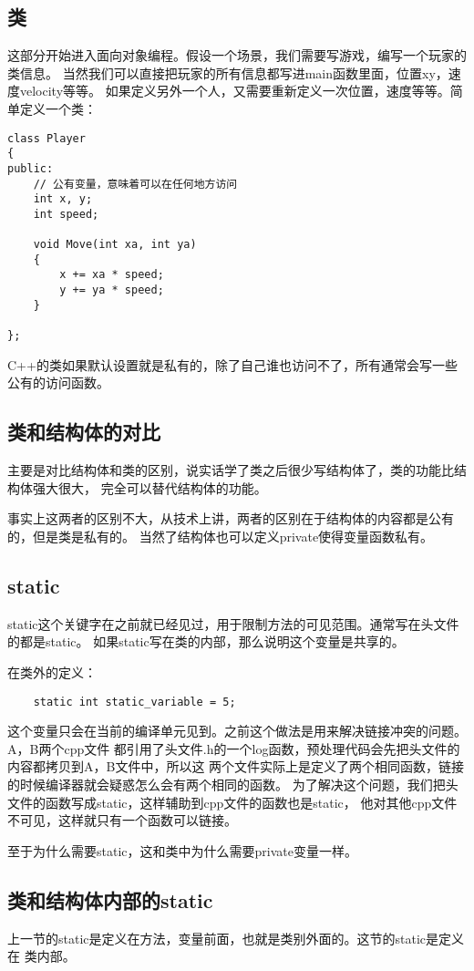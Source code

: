 \documentclass{article}
\begin{document}
\begin{sloppypar}
\subsection{类}
这部分开始进入面向对象编程。假设一个场景，我们需要写游戏，编写一个玩家的类信息。
当然我们可以直接把玩家的所有信息都写进main函数里面，位置xy，速度velocity等等。
如果定义另外一个人，又需要重新定义一次位置，速度等等。简单定义一个类：
\begin{lstlisting}
class Player
{
public:
    // 公有变量，意味着可以在任何地方访问
    int x, y;
    int speed;

    void Move(int xa, int ya)
    {
        x += xa * speed;
        y += ya * speed;
    }

};
\end{lstlisting}
C++的类如果默认设置就是私有的，除了自己谁也访问不了，所有通常会写一些公有的访问函数。

\subsection{类和结构体的对比}
主要是对比结构体和类的区别，说实话学了类之后很少写结构体了，类的功能比结构体强大很大，
完全可以替代结构体的功能。

事实上这两者的区别不大，从技术上讲，两者的区别在于结构体的内容都是公有的，但是类是私有的。
当然了结构体也可以定义private使得变量函数私有。

\subsection{static}
static这个关键字在之前就已经见过，用于限制方法的可见范围。通常写在头文件的都是static。
如果static写在类的内部，那么说明这个变量是共享的。

在类外的定义：
\begin{lstlisting}
	static int static_variable = 5;
\end{lstlisting}
这个变量只会在当前的编译单元见到。之前这个做法是用来解决链接冲突的问题。A，B两个cpp文件
都引用了头文件.h的一个log函数，预处理代码会先把头文件的内容都拷贝到A，B文件中，所以这
两个文件实际上是定义了两个相同函数，链接的时候编译器就会疑惑怎么会有两个相同的函数。
为了解决这个问题，我们把头文件的函数写成static，这样辅助到cpp文件的函数也是static，
他对其他cpp文件不可见，这样就只有一个函数可以链接。

至于为什么需要static，这和类中为什么需要private变量一样。

\subsection{类和结构体内部的static}
上一节的static是定义在方法，变量前面，也就是类别外面的。这节的static是定义在
类内部。


\end{sloppypar}
\end{document}
